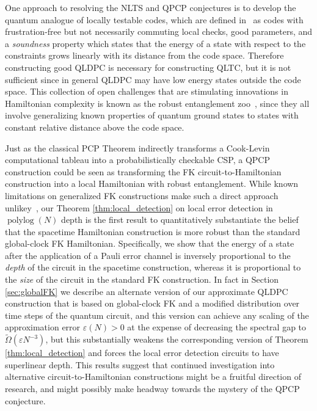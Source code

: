 \documentclass[11pt,letterpaper]{article}
\theoremstyle{definition}
\theoremstyle{remark}
\DeclareMathOperator{\polylog}{polylog}
\numberwithin{equation}{section}
\theoremstyle{definition}
\begin{document}
One approach to resolving the NLTS and QPCP conjectures is to develop the quantum analogue of locally testable codes, which are defined in~\cite{aharonov2015quantum} as codes with frustration-free but not necessarily commuting local checks, good parameters, and a \emph{soundness} property which states that the energy of a state with respect to the constraints grows linearly with its distance from the code space.  Therefore constructing good QLDPC is necessary for constructing QLTC, but it is not sufficient since in general QLDPC may have low energy states outside the code space.  This collection of open challenges that are stimulating innovations in Hamiltonian complexity is known as the robust entanglement zoo~\cite{eldar2017local}, since they all involve generalizing known properties of quantum ground states to states with constant relative distance above the code space.  

%

Just as the classical PCP Theorem indirectly transforms a Cook-Levin computational tableau into a probabilistically checkable CSP, a QPCP construction could be seen as transforming the FK circuit-to-Hamiltonian construction into a local Hamiltonian with robust entanglement.   While known limitations on generalized FK constructions make such a direct approach unlikey~\cite{ganti2013gap,Bausch2018analysislimitations,gonzalez2018history}, our Theorem \ref{thm:local_detection} on local error detection in $\polylog(N)$ depth is the first result to quantitatively substantiate the belief that the spacetime Hamiltonian construction is more robust than the standard global-clock FK Hamiltonian.  Specifically, we show that the energy of a state after the application of a Pauli error channel is inversely proportional to the \emph{depth} of the circuit in the spacetime construction, whereas it is proportional to the \emph{size} of the circuit in the standard FK construction.  In fact in Section \ref{sec:globalFK} we describe an alternate version of our approximate QLDPC construction that is based on global-clock FK and a modified distribution over time steps of the quantum circuit, and this version can achieve any scaling of the approximation error $\varepsilon(N) > 0$ at the expense of decreasing the spectral gap to $\tilde{\Omega}(\varepsilon N^{-3})$, but this substantially weakens the corresponding version of Theorem \ref{thm:local_detection} and forces the local error detection circuits to have superlinear depth.  This results suggest that continued investigation into alternative circuit-to-Hamiltonian constructions might be a fruitful direction of research, and might possibly make headway towards the mystery of the QPCP conjecture.
\end{document}
